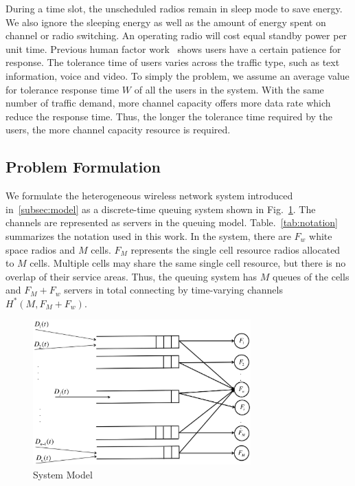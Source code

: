 During a time slot, the unscheduled radios remain in sleep mode to save energy. We also ignore 
the sleeping energy as well as the amount of energy spent on channel or radio switching. An operating 
radio will cost equal standby power per unit time. Previous human factor work~\cite{niida2010user} 
shows users have a certain patience for response. 
The tolerance time of users varies across the traffic type, such as text information, 
voice and video. To simply the problem, we assume an average value for tolerance response time $W$ 
of all the users in the system. 
With the same number of traffic demand, more channel capacity offers more data rate which reduce 
the response time.
Thus, the longer the tolerance time required by the users, the more channel capacity resource is 
required.

\subsection{Problem Formulation}
\label{subsec:problem}

We formulate the heterogeneous wireless network system introduced in~\ref{subsec:model} as a 
discrete-time queuing system shown in Fig.~\ref{fig:flowconfig}. 
The channels are represented as servers in the queuing model. 
Table.~\ref{tab:notation} summarizes the notation used in this work. 
In the system, there are $F_w$ white space radios and $M$ cells. 
$F_M$ represents the single cell resource radios allocated to $M$ cells. 
Multiple cells may share the same single cell resource, but there is no overlap of their service areas.
Thus, the queuing system has $M$ queues of the cells and $F_M+F_w$ servers in total connecting 
by time-varying channels $H^*(M,F_M+F_w)$.



\begin{figure}
\vspace{-0.0in}
\centering
\includegraphics[width=84mm]{figures/flowconfig}
\vspace{-0.1in}
\caption{System Model}
\label{fig:flowconfig}
\vspace{-0.1in}
\end{figure}

